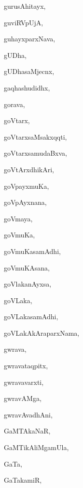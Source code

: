 \begin{multicols}{3}
{\noindent
{gurusAhitayx}, \pageref{gurusAhitayx}

\noindent
{guviRVpUjA}, \pageref{guviRVpUjA}

\noindent
{guhayxparxNava}, \pageref{guhayxparxNava}

\noindent
{gUDha}, \pageref{gUDha}

\noindent
{gUDhasaMjecnx}, \pageref{gUDhasaMjecnx}

\noindent
{gaqhashudidhx}, \pageref{gaqhashudidhx}

\noindent
{gorava}, \pageref{gorava}

\noindent
{goVtarx}, \pageref{goVtarx}

\noindent
{goVtarxsaMsakxqqti}, \pageref{goVtarxsaMsakxqqti}

\noindent
{goVtarxsamudaBxva}, \pageref{goVtarxsamudaBxva}

\noindent
{goVtArxdhikAri}, \pageref{goVtArxdhikAri}

\noindent
{goVpayxmuKa}, \pageref{goVpayxmuKa}

\noindent
{goVpAyxnana}, \pageref{goVpAyxnana}

\noindent
{goVmaya}, \pageref{goVmaya}

\noindent
{goVmuKa}, \pageref{goVmuKa}

\noindent
{goVmuKasamAdhi}, \pageref{goVmuKasamAdhi}

\noindent
{goVmuKAsana}, \pageref{goVmuKAsana}

\noindent
{goVlakanAyxsa}, \pageref{goVlakanAyxsa}

\noindent
{goVLaka}, \pageref{goVLaka}

\noindent
{goVLakasamAdhi}, \pageref{goVLakasamAdhi}

\noindent
{goVLakAkAraparxNama}, \pageref{goVLakAkAraparxNama}

\noindent
{gwrava}, \pageref{gwrava}

\noindent
{gwravataqpitx}, \pageref{gwravataqpitx}

\noindent
{gwravavarxti}, \pageref{gwravavarxti}

\noindent
{gwravAMga}, \pageref{gwravAMga}

\noindent
{gwravAvadhAni}, \pageref{gwravAvadhAni}

\noindent
{GaMTAkaNaR}, \pageref{GaMTAkaNaR}

\noindent
{GaMTikAliMgamUla}, \pageref{GaMTikAliMgamUla}

\noindent
{GaTa}, \pageref{GaTa}

\noindent
{GaTakamiR}, \pageref{GaTakamiR}

}
\end{multicols}
